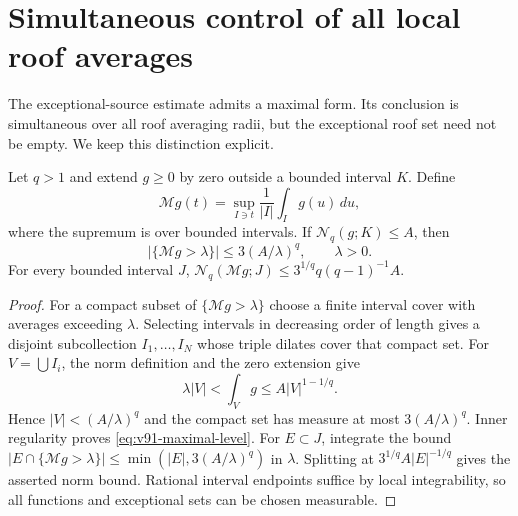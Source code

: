 \section{Simultaneous control of all local roof averages}
\label{sec:v91-maximal}
The exceptional-source estimate admits a maximal form. Its conclusion
is simultaneous over all roof averaging radii, but the exceptional
roof set need not be empty. We keep this distinction explicit.

\begin{lemma}
\label{lem:v91-maximal}
Let $q>1$ and extend $g\ge0$ by zero outside a bounded interval $K$.
Define
\[
 \mathcal Mg(t)=\sup_{I\ni t}\frac1{|I|}\int_I g(u)\,du,
\]
where the supremum is over bounded intervals. If
$\mathcal N_q(g;K)\le A$, then
\begin{equation}\label{eq:v91-maximal-level}
       |\{\mathcal Mg>\lambda\}|\le3(A/\lambda)^q,
                         \qquad \lambda>0.
\end{equation}
For every bounded interval $J$,
$\mathcal N_q(\mathcal Mg;J)\le3^{1/q}q(q-1)^{-1}A$.
\end{lemma}
\begin{proof}
For a compact subset of $\{\mathcal Mg>\lambda\}$ choose a finite
interval cover with averages exceeding $\lambda$. Selecting intervals
in decreasing order of length gives a disjoint subcollection
$I_1,\ldots,I_N$ whose triple dilates cover that compact set.
For $V=\bigcup I_i$, the norm definition and the zero extension give
\[
 \lambda|V|<\int_Vg\le A|V|^{1-1/q}.
\]
Hence $|V|<(A/\lambda)^q$ and the compact set has measure at most
$3(A/\lambda)^q$. Inner regularity proves
\eqref{eq:v91-maximal-level}. For $E\subset J$, integrate the
bound $|E\cap\{\mathcal Mg>\lambda\}|\le
\min(|E|,3(A/\lambda)^q)$ in $\lambda$. Splitting at
$3^{1/q}A|E|^{-1/q}$ gives the asserted norm bound. Rational
interval endpoints suffice by local integrability, so all functions
and exceptional sets can be chosen measurable.
\end{proof}

